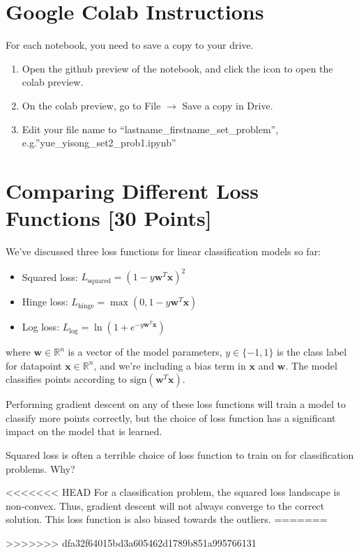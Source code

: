 \section*{Google Colab Instructions}
For each notebook, you need to save a copy to your drive.
\begin{enumerate}
	\item Open the github preview of the notebook, and click the icon to open the colab preview.
	\item On the colab preview, go to File $\rightarrow$ Save a copy in Drive.
	\item Edit your file name to “lastname_firstname_set_problem”, e.g.”yue_yisong_set2_prob1.ipynb”
\end{enumerate}



\newpage
\section{Comparing Different Loss Functions [30 Points]}

We've discussed three loss functions for linear classification models so far:
\begin{itemize}
\item Squared loss: $L_\text{squared} = (1 - y\mathbf{w}^T\mathbf{x})^2$
\item Hinge loss: $L_\text{hinge} = \max(0, 1 - y\mathbf{w}^T\mathbf{x})$
\item Log loss: $L_\text{log} = \ln(1 + e^{-y\mathbf{w}^T\mathbf{x}})$
\end{itemize}
where $\mathbf{w} \in \mathbb{R}^n$ is a vector of the model parameters, $y \in \{-1,1\}$ is the class label for datapoint $\mathbf{x} \in \mathbb{R}^n$, and we're including a bias term in $\mathbf{x}$ and $\mathbf{w}$.  The model classifies points according to $\text{sign}(\mathbf{w}^T\mathbf{x})$.

Performing gradient descent on any of these loss functions will train a model to classify more points correctly, but the choice of loss function has a significant impact on the model that is learned.

\problem[3]
Squared loss is often a terrible choice of loss function to train on for classification problems.  Why?

\begin{solution}
<<<<<<< HEAD
  For a classification problem, the squared loss landscape is non-convex. Thus, gradient descent will not always converge to the correct solution. This loss function is also biased towards the outliers.
=======

>>>>>>> dfa32f64015bd3a605462d1789b851a995766131
\end{solution}

